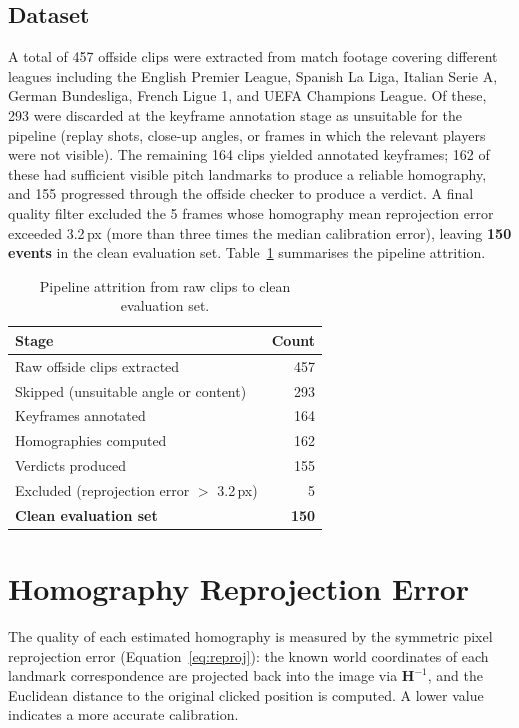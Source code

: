 \subsection{Dataset}

A total of 457 offside clips were extracted from match footage covering different leagues including the English Premier League, Spanish La Liga, Italian Serie A, German Bundesliga, French Ligue 1, and UEFA Champions League. Of these, 293 were discarded at the keyframe annotation stage as unsuitable for the pipeline (replay shots, close-up angles, or frames in which the relevant players were not visible). The remaining 164 clips yielded annotated keyframes; 162 of these had sufficient visible pitch landmarks to produce a reliable homography, and 155 progressed through the offside checker to produce a verdict. A final quality filter excluded the 5 frames whose homography mean reprojection error exceeded 3.2\,px (more than three times the median calibration error), leaving \textbf{150 events} in the clean evaluation set. Table~\ref{tab:attrition} summarises the pipeline attrition.

\begin{table}[htbp]
  \centering
  \caption{Pipeline attrition from raw clips to clean evaluation set.}
  \label{tab:attrition}
  \begin{tabular}{lr}
    \hline
    Stage & Count \\
    \hline
    Raw offside clips extracted & 457 \\
    Skipped (unsuitable angle or content) & 293 \\
    Keyframes annotated & 164 \\
    Homographies computed & 162 \\
    Verdicts produced & 155 \\
    Excluded (reprojection error $>$ 3.2\,px) & 5 \\
    \textbf{Clean evaluation set} & \textbf{150} \\
    \hline
  \end{tabular}
\end{table}

\section{Homography Reprojection Error}%
\label{sec:eval_homography}

The quality of each estimated homography is measured by the symmetric pixel reprojection error (Equation~\ref{eq:reproj}): the known world coordinates of each landmark correspondence are projected back into the image via $\mathbf{H}^{-1}$, and the Euclidean distance to the original clicked position is computed. A lower value indicates a more accurate calibration.

